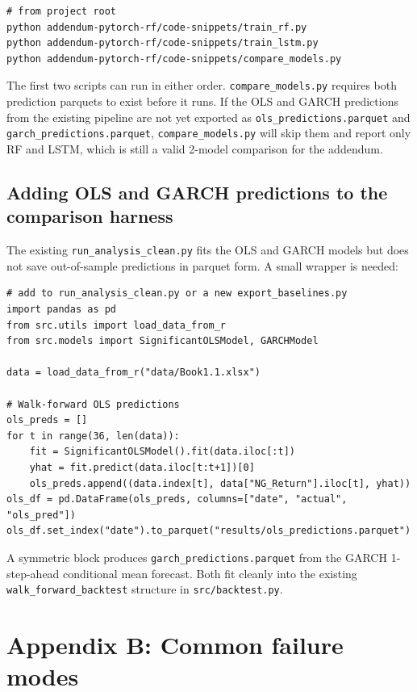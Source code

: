 \documentclass[11pt,letterpaper]{article}
\begin{document}
\begin{lstlisting}
# from project root
python addendum-pytorch-rf/code-snippets/train_rf.py
python addendum-pytorch-rf/code-snippets/train_lstm.py
python addendum-pytorch-rf/code-snippets/compare_models.py
\end{lstlisting}

The first two scripts can run in either order. \texttt{compare\_models.py} requires both prediction parquets to exist before it runs. If the OLS and GARCH predictions from the existing pipeline are not yet exported as \texttt{ols\_predictions.parquet} and \texttt{garch\_predictions.parquet}, \texttt{compare\_models.py} will skip them and report only RF and LSTM, which is still a valid 2-model comparison for the addendum.

\subsection{Adding OLS and GARCH predictions to the comparison harness}

The existing \texttt{run\_analysis\_clean.py} fits the OLS and GARCH models but does not save out-of-sample predictions in parquet form. A small wrapper is needed:

\begin{lstlisting}
# add to run_analysis_clean.py or a new export_baselines.py
import pandas as pd
from src.utils import load_data_from_r
from src.models import SignificantOLSModel, GARCHModel

data = load_data_from_r("data/Book1.1.xlsx")

# Walk-forward OLS predictions
ols_preds = []
for t in range(36, len(data)):
    fit = SignificantOLSModel().fit(data.iloc[:t])
    yhat = fit.predict(data.iloc[t:t+1])[0]
    ols_preds.append((data.index[t], data["NG_Return"].iloc[t], yhat))
ols_df = pd.DataFrame(ols_preds, columns=["date", "actual", "ols_pred"])
ols_df.set_index("date").to_parquet("results/ols_predictions.parquet")
\end{lstlisting}

A symmetric block produces \texttt{garch\_predictions.parquet} from the GARCH 1-step-ahead conditional mean forecast. Both fit cleanly into the existing \texttt{walk\_forward\_backtest} structure in \texttt{src/backtest.py}.

\section{Appendix B: Common failure modes}
\end{document}
